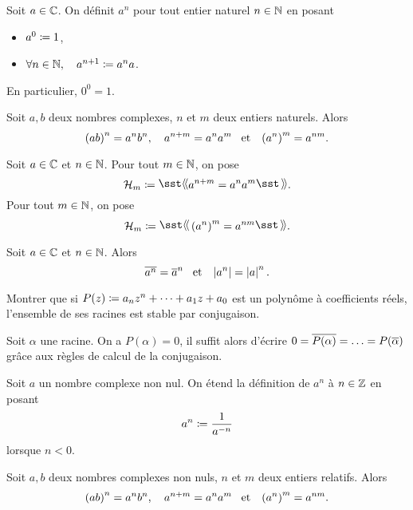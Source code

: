 \documentclass{magnolia}
\begin{document}
\begin{definition}[utile=-3]
  Soit $a\in\mathbb{C}$. On définit $a^n$ pour tout entier naturel $n\in\mathbb{N}$ en posant
  \begin{itemize}
    \item $a^0\coloneqq 1$,
    \item $\forall n\in\mathbb{N} ,\quad a^{n+1}\coloneqq a^n a$.
  \end{itemize}
\end{definition}

\begin{remarqueUnique}
\remarque En particulier, $0^0=1$.
\end{remarqueUnique}

\begin{proposition}[utile=-3]
  Soit $a,b$ deux nombres complexes, $n$ et $m$ deux entiers
  naturels. Alors
  \[\left(ab\right)^n=a^n b^n, \quad a^{n+m}=a^n a^m \quad\!\text{et}\quad\! 
    \left(a^n\right)^m=a^{nm}.\]
\end{proposition}

\begin{preuve}
Soit $a\in\mathbb{C}$ et $n\in\mathbb{N}$. Pour tout $m\in\mathbb{N}$, on pose
\[\mathcal{H}_m\defeq\mog a^{n+m}=a^n a^m\mfg.\]
Pour tout $m\in\mathbb{N}$, on pose
\[\mathcal{H}_m\defeq\mog \p{a^n}^m=a^{nm}\mfg.\]
\end{preuve}

\begin{proposition}[utile=-3]
  Soit $a\in\mathbb{C}$ et $n\in\mathbb{N}$. Alors
  \[\overline{a^n}=\overline{a}^n \quad\!\text{et}\quad\! \left|a^n\right|=\left|a\right|^n.\]
\end{proposition}

\begin{exoUnique}
\exo Montrer que si $P(z)\coloneqq a_n z^n+\cdots+a_1 z+a_0$ est un polynôme à coefficients réels, l'ensemble de ses racines est stable par conjugaison.
\end{exoUnique}

\begin{sol}
Soit $\alpha$ une racine. On a $P(\alpha)=0$, il suffit alors d'écrire $0=\overline{P(\alpha)}=\ldots=P(\overline{\alpha})$ grâce aux règles de calcul de la conjugaison.
\end{sol}

\begin{definition}
  Soit $a$ un nombre complexe non nul. On étend la définition de
  $a^n$ à $n\in\mathbb{Z}$ en posant
  $$a^n\coloneqq \frac{1}{a^{-n}}$$
  lorsque $n<0$.
\end{definition}

\begin{proposition}
Soit $a,b$ deux nombres complexes non nuls, $n$ et $m$ deux entiers
relatifs. Alors
\[\left(ab\right)^n=a^n b^n,\quad
  a^{n+m}=a^n a^m \quad\!\text{et}\quad\!
  \left(a^n\right)^m=a^{nm}.\]
\end{proposition}
\end{document}
